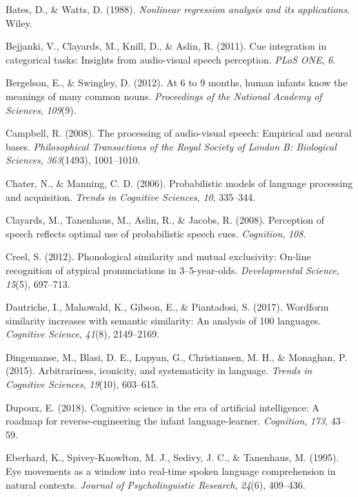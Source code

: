 \documentclass[english,,man,floatsintext]{apa6}
\theoremstyle{definition}
\theoremstyle{definition}
\theoremstyle{definition}
\theoremstyle{remark}
\begin{document}
\hypertarget{ref-bates88}{}
Bates, D., \& Watts, D. (1988). \emph{Nonlinear regression analysis and
its applications}. Wiley.

\hypertarget{ref-bejjanki2011}{}
Bejjanki, V., Clayards, M., Knill, D., \& Aslin, R. (2011). Cue
integration in categorical tasks: Insights from audio-visual speech
perception. \emph{PLoS ONE}, \emph{6}.

\hypertarget{ref-bergelson2012}{}
Bergelson, E., \& Swingley, D. (2012). At 6 to 9 months, human infants
know the meanings of many common nouns. \emph{Proceedings of the
National Academy of Sciences}, \emph{109}(9).

\hypertarget{ref-Campbell2008}{}
Campbell, R. (2008). The processing of audio-visual speech: Empirical
and neural bases. \emph{Philosophical Transactions of the Royal Society
of London B: Biological Sciences}, \emph{363}(1493), 1001--1010.

\hypertarget{ref-chater06}{}
Chater, N., \& Manning, C. D. (2006). Probabilistic models of language
processing and acquisition. \emph{Trends in Cognitive Sciences},
\emph{10}, 335--344.

\hypertarget{ref-clayard08}{}
Clayards, M., Tanenhaus, M., Aslin, R., \& Jacobs, R. (2008). Perception
of speech reflects optimal use of probabilistic speech cues.
\emph{Cognition}, \emph{108}.

\hypertarget{ref-Creel2012}{}
Creel, S. (2012). Phonological similarity and mutual exclusivity:
On-line recognition of atypical pronunciations in 3--5-year-olds.
\emph{Developmental Science}, \emph{15}(5), 697--713.

\hypertarget{ref-dautriche17}{}
Dautriche, I., Mahowald, K., Gibson, E., \& Piantadosi, S. (2017).
Wordform similarity increases with semantic similarity: An analysis of
100 languages. \emph{Cognitive Science}, \emph{41}(8), 2149--2169.

\hypertarget{ref-dingemanse2015}{}
Dingemanse, M., Blasi, D. E., Lupyan, G., Christiansen, M. H., \&
Monaghan, P. (2015). Arbitrariness, iconicity, and systematicity in
language. \emph{Trends in Cognitive Sciences}, \emph{19}(10), 603--615.

\hypertarget{ref-dupoux2018}{}
Dupoux, E. (2018). Cognitive science in the era of artificial
intelligence: A roadmap for reverse-engineering the infant
language-learner. \emph{Cognition}, \emph{173}, 43--59.

\hypertarget{ref-Eberhard1995}{}
Eberhard, K., Spivey-Knowlton, M. J., Sedivy, J. C., \& Tanenhaus, M.
(1995). Eye movements as a window into real-time spoken language
comprehension in natural contexts. \emph{Journal of Psycholinguistic
Research}, \emph{24}(6), 409--436.
\end{document}
